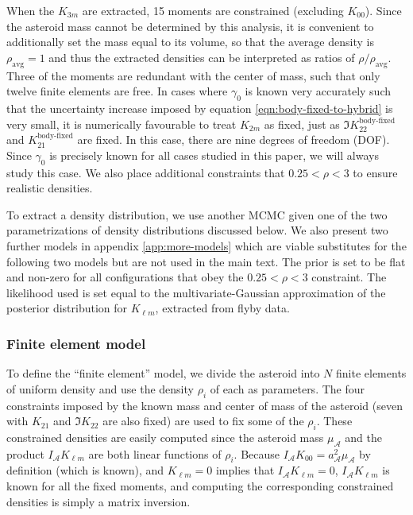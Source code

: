 \documentclass[fleqn,usenatbib]{mnras}
\begin{document}
When the $K_{3m}$ are extracted, 15 moments are constrained (excluding $K_{00}$). Since the asteroid mass cannot be determined by this analysis, it is convenient to additionally set the mass equal to its volume, so that the average density is $\rho_\text{avg}=1$ and thus the extracted densities can be interpreted as ratios of $\rho / \rho_\text{avg}$. Three of the moments are redundant with the center of mass, such that only twelve finite elements are free. In cases where $\gamma_0$ is known very accurately such that the uncertainty increase imposed by equation \ref{eqn:body-fixed-to-hybrid} is very small, it is numerically favourable to treat $K_{2m}$ as fixed, just as $\Im K_{22}^\text{body-fixed}$ and $K_{21}^\text{body-fixed}$ are fixed. In this case, there are nine degrees of freedom (DOF). Since $\gamma_0$ is precisely known for all cases studied in this paper, we will always study this case. We also place additional constraints that $0.25 < \rho < 3$ to ensure realistic densities.

To extract a density distribution, we use another MCMC given one of the two parametrizations of density distributions discussed below.  We also present two further models in appendix \ref{app:more-models} which are viable substitutes for the following two models but are not used in the main text. The prior is set to be flat and non-zero for all configurations that obey the $0.25 < \rho < 3$ constraint. The likelihood used is set equal to the multivariate-Gaussian approximation of the posterior distribution for $K_{\ell m}$, extracted from flyby data.



\subsubsection{Finite element model}

To define the ``finite element'' model, we divide the asteroid into $N$ finite elements of uniform density and use the density $\rho_i$ of each as parameters. The four constraints imposed by the known mass and center of mass of the asteroid (seven with $K_{21}$ and $\Im K_{22}$ are also fixed) are used to fix some of the $\rho_i$. These constrained densities are easily computed since the asteroid mass $\mu_\mathcal{A}$ and the product $I_\mathcal{A}K_{\ell m}$ are both linear functions of $\rho_i$. Because $I_\mathcal{A}K_{00} = a_\mathcal{A}^2\mu_\mathcal{A}$ by definition (which is known), and $K_{\ell m} = 0$ implies that $I_\mathcal{A}K_{\ell m} = 0$, $I_\mathcal{A} K_{\ell m}$ is known for all the fixed moments, and computing the corresponding constrained densities is simply a matrix inversion.
\end{document}
